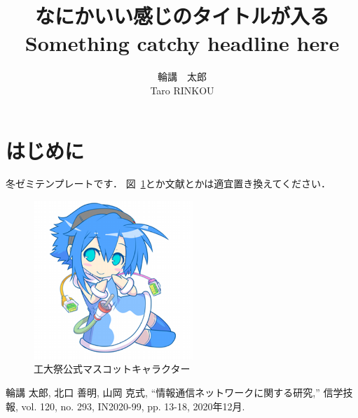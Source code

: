 \documentclass[twocolumn,a4paper]{ieicejsp}
\title{\bf なにかいい感じのタイトルが入る\\
\small{Something catchy headline here}}
\author{
    輪講　太郎 \\ Taro RINKOU
}
\begin{document}
\maketitle

\section{はじめに}
冬ゼミテンプレートです．
図~\ref{fig:tech-chan}とか文献\cite{myself}とかは適宜置き換えてください．

\begin{figure}[!t]
  \centering
  \includegraphics[width=60mm]{tech-chan.png}
  \caption{工大祭公式マスコットキャラクター}
  \label{fig:tech-chan}
\end{figure}

\begin{thebibliography}{9}
\footnotesize
{}
輪講 太郎, 北口 善明, 山岡 克式, ``情報通信ネットワークに関する研究,'' 信学技報, vol. 120, no. 293, IN2020-99, pp. 13-18, 2020年12月.
\end{thebibliography}
\end{document}
